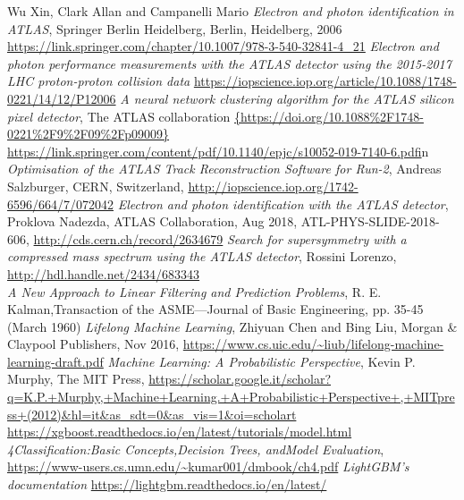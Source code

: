 \documentclass[a4paper, oneside]{book}
\begin{document}
\begin{thebibliography}{32}
			 Wu Xin, Clark Allan and Campanelli Mario \textit{Electron and photon identification in ATLAS}, Springer Berlin Heidelberg, Berlin, Heidelberg, 2006
			\url{https://link.springer.com/chapter/10.1007/978-3-540-32841-4_21} 
			\textit{Electron and photon performance measurements with the {ATLAS} detector using the 2015-2017 {LHC} proton-proton collision data}
			\url{https://iopscience.iop.org/article/10.1088/1748-0221/14/12/P12006}
			 \textit{A neural network clustering algorithm for the ATLAS silicon pixel detector}, The ATLAS collaboration
			\url{{https://doi.org/10.1088%2F1748-0221%2F9%2F09%2Fp09009}}
			\url{https://link.springer.com/content/pdf/10.1140/epjc/s10052-019-7140-6.pdf}in
			 \textit{Optimisation of the ATLAS Track Reconstruction Software for Run-2}, Andreas Salzburger, CERN, Switzerland, \url{http://iopscience.iop.org/1742-6596/664/7/072042}
			 \textit{Electron and photon identification with the ATLAS detector}, Proklova Nadezda, ATLAS Collaboration, Aug 2018, ATL-PHYS-SLIDE-2018-606, \url{http://cds.cern.ch/record/2634679}
			 \textit{Search for supersymmetry with a compressed mass spectrum using the ATLAS detector}, Rossini Lorenzo, \url{http://hdl.handle.net/2434/683343 }\\
			 \textit{A New Approach to Linear Filtering and Prediction Problems}, R. E. Kalman,Transaction of the ASME—Journal of Basic Engineering,
			pp. 35-45 (March 1960)
			 \textit{Lifelong Machine Learning}, Zhiyuan Chen and Bing Liu, Morgan \& Claypool Publishers, Nov 2016, \url{https://www.cs.uic.edu/~liub/lifelong-machine-learning-draft.pdf}
			 \textit{Machine Learning: A Probabilistic Perspective}, Kevin P. Murphy, The MIT Press, \url{https://scholar.google.it/scholar?q=K.P.+Murphy,+Machine+Learning.+A+Probabilistic+Perspective+,+MITpress+(2012)&hl=it&as_sdt=0&as_vis=1&oi=scholart}
			 \url{https://xgboost.readthedocs.io/en/latest/tutorials/model.html}
			 \textit{4Classification:Basic Concepts,Decision Trees, andModel Evaluation}, \url{https://www-users.cs.umn.edu/~kumar001/dmbook/ch4.pdf}
			 \textit{LightGBM’s documentation} 
			\url{https://lightgbm.readthedocs.io/en/latest/}
			

\end{thebibliography}
\end{document}
